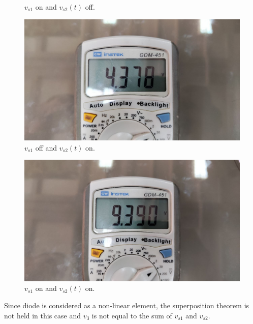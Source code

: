 \documentclass[11pt]{article}
\begin{document}
\begin{question}
\begin{subquestion}
{\begin{figure}[H]
                \caption{$v_{s1}$ on and $v_{s2}(t)$ off.}
            \end{figure}
            \begin{figure}[H]
                \centering
                \includegraphics[scale=\PicScale,angle=0]{Fig/14.jpeg}
                \caption{$v_{s1}$ off and $v_{s2}(t)$ on.}
            \end{figure}
            \begin{figure}[H]
                \centering
                \includegraphics[scale=\PicScale,angle=0]{Fig/15.jpeg}
                \caption{$v_{s1}$ on and $v_{s2}(t)$ on.}
            \end{figure}

            Since diode is considered as a non-linear element,
            the superposition theorem is not held in this case and
            $v_3$ is not equal to the sum of $v_{s1}$ and $v_{s2}$.
        }
    \end{subquestion}

\end{question}

\end{document}
